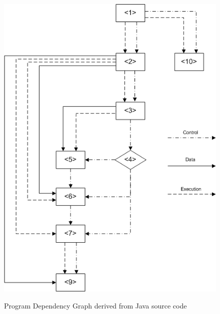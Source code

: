 \documentclass{report}
\begin{document}
\begin{figure}[h]
  \centering
  \includegraphics[scale=0.55]{Figures/exist-alg/pdg-example.png}\\[0.1cm]
  \caption[PDG 2]{Program Dependency Graph derived from Java source code}
  \label{fig:pdg-ex}
\end{figure}
\end{document}
